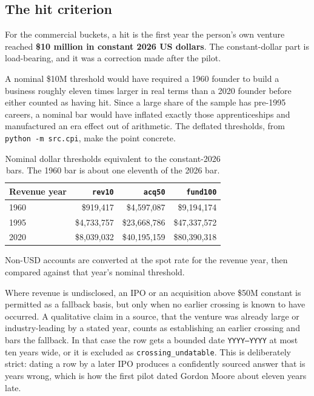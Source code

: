 \documentclass[11pt]{article}
\begin{document}
\subsection{The hit criterion}

For the commercial buckets, a hit is the first year the person's own venture
reached \textbf{\$10 million in constant 2026 US dollars}. The constant-dollar
part is load-bearing, and it was a correction made after the pilot.

A nominal \$10M threshold would have required a 1960 founder to build a
business roughly eleven times larger in real terms than a 2020 founder before
either counted as having hit. Since a large share of the sample has pre-1995
careers, a nominal bar would have inflated exactly those apprenticeships and
manufactured an era effect out of arithmetic. The deflated thresholds, from
\texttt{python -m src.cpi}, make the point concrete.

\begin{table}[h]
\centering
\begin{tabular}{lrrr}
\toprule
Revenue year & \texttt{rev10} & \texttt{acq50} & \texttt{fund100} \\
\midrule
1960 & \$919,417 & \$4,597,087 & \$9,194,174 \\
1995 & \$4,733,757 & \$23,668,786 & \$47,337,572 \\
2020 & \$8,039,032 & \$40,195,159 & \$80,390,318 \\
\bottomrule
\end{tabular}
\caption{Nominal dollar thresholds equivalent to the constant-2026 bars. The
1960 bar is about one eleventh of the 2026 bar.}
\end{table}

Non-USD accounts are converted at the spot rate for the revenue year, then
compared against that year's nominal threshold.

Where revenue is undisclosed, an IPO or an acquisition above \$50M constant is
permitted as a fallback basis, but only when no earlier crossing is known to
have occurred. A qualitative claim in a source, that the venture was already
large or industry-leading by a stated year, counts as establishing an earlier
crossing and bars the fallback. In that case the row gets a bounded date
\texttt{YYYY--YYYY} at most ten years wide, or it is excluded as
\texttt{crossing\_undatable}. This is deliberately strict: dating a row by a
later IPO produces a confidently sourced answer that is years wrong, which is
how the first pilot dated Gordon Moore about eleven years late.
\end{document}
